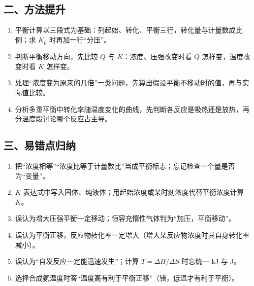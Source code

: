 \documentclass[UTF8,a4paper,zihao=5,oneside,openany,fontset=none]{ctexbook}
\begin{document}
\subsection*{二、方法提升}
\begin{enumerate}
\item 平衡计算以三段式为基础：列起始、转化、平衡三行，转化量与计量数成比例；求 $K_p$ 时再加一行“分压”。
\item 判断平衡移动方向，先比较 $Q$ 与 $K$：浓度、压强改变时看 $Q$ 怎样变，温度改变时看 $K$ 怎样变。
\item 处理“浓度变为原来的几倍”一类问题，先算出假设平衡不移动时的值，再与实际值比较。
\item 分析多重平衡中转化率随温度变化的曲线，先判断各反应是吸热还是放热，再分温度段讨论哪个反应占主导。
\end{enumerate}

\subsection*{三、易错点归纳}
\begin{enumerate}
\item 把“浓度相等”“浓度比等于计量数比”当成平衡标志；忘记检查一个量是否为“变量”。
\item $K$ 表达式中写入固体、纯液体；用起始浓度或某时刻浓度代替平衡浓度计算 $K$。
\item 误认为增大压强平衡一定移动；恒容充惰性气体判为“加压，平衡移动”。
\item 误认为平衡正移，反应物转化率一定增大（增大某反应物浓度时其自身转化率减小）。
\item 误认为“自发反应一定能迅速发生”；计算 $T=\Delta H/\Delta S$ 时忘统一 kJ 与 J。
\item 选择合成氨温度时答“温度高有利于平衡正移”（错，低温才有利于平衡）。
\end{enumerate}
\end{document}
